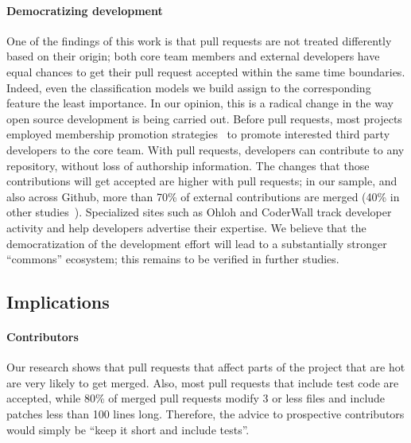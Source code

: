 \documentclass{sig-alternate}
\begin{document}
\paragraph{Democratizing development} One of the findings of this work is that
pull requests are not treated differently based on their origin; both core team
members and external developers have equal chances to get their pull request
accepted within the same time boundaries. Indeed, even the classification
models we build assign to the corresponding feature the least importance.
In our opinion, this is a radical
change in the way open source development is being carried out. Before pull
requests, most projects employed membership promotion strategies~\cite{Jense07}
to promote interested third party developers to the core team. With pull
requests, developers can contribute to any repository, without loss of authorship
information. The changes that those contributions will get accepted are higher
with pull requests; in our sample, and also across Github, more than 70\% of external
contributions are merged (40\% in other studies~\cite{Rigby06, Weiss08}).
Specialized sites such as Ohloh and CoderWall track developer activity and help
developers advertise their expertise. We believe that the democratization of the
development effort will lead to a substantially stronger ``commons'' ecosystem;
this remains to be verified in further studies.

\subsection{Implications}

\paragraph{Contributors} 

Our research shows that pull requests that affect parts of the project
that are hot are very likely to get merged. Also, most pull requests that
include test code are accepted, while 80\% of merged pull requests modify
3 or less files and include patches less than 100 lines long. Therefore,
the advice to prospective contributors would simply be ``keep it short and
include tests''.
\end{document}
